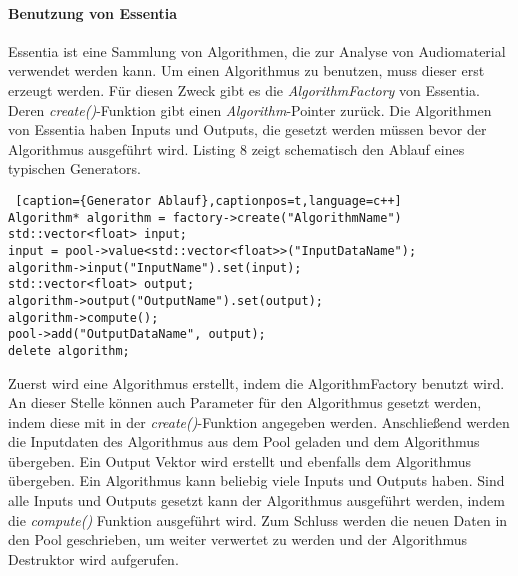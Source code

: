 \documentclass[11pt,a4paper]{article}
\begin{document}
\paragraph{Benutzung von Essentia}
Essentia ist eine Sammlung von Algorithmen, die zur Analyse von Audiomaterial verwendet werden kann. Um einen Algorithmus zu benutzen, muss dieser erst erzeugt werden. Für diesen Zweck gibt es die \textit{AlgorithmFactory} von Essentia. Deren \textit{create()}-Funktion gibt einen \textit{Algorithm}-Pointer zurück. Die Algorithmen von Essentia haben Inputs und Outputs, die gesetzt werden müssen bevor der Algorithmus ausgeführt wird. Listing 8 zeigt schematisch den Ablauf eines typischen Generators.
\begin{lstlisting} [caption={Generator Ablauf},captionpos=t,language=c++]
Algorithm* algorithm = factory->create("AlgorithmName")
std::vector<float> input;
input = pool->value<std::vector<float>>("InputDataName");
algorithm->input("InputName").set(input);
std::vector<float> output;
algorithm->output("OutputName").set(output);
algorithm->compute();
pool->add("OutputDataName", output);
delete algorithm;
\end{lstlisting}
\noindent
Zuerst wird eine Algorithmus erstellt, indem die AlgorithmFactory benutzt wird. An dieser Stelle können auch Parameter für den Algorithmus gesetzt werden, indem diese mit in der \textit{create()}-Funktion angegeben werden. Anschließend werden die Inputdaten des Algorithmus aus dem Pool geladen und dem Algorithmus übergeben. Ein Output Vektor wird erstellt und ebenfalls dem Algorithmus übergeben. Ein Algorithmus kann beliebig viele Inputs und Outputs haben. Sind alle Inputs und Outputs gesetzt kann der Algorithmus ausgeführt werden, indem die \textit{compute()} Funktion ausgeführt wird. Zum Schluss werden die neuen Daten in den Pool geschrieben, um weiter verwertet zu werden und der Algorithmus Destruktor wird aufgerufen.
\end{document}
